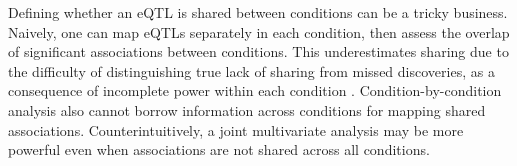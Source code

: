 Defining whether an \gls{eQTL} is shared between conditions can be a tricky business.
Naively, one can map \glspl{eQTL} separately in each condition, then assess the overlap of significant associations between conditions.
This underestimates sharing due to the difficulty of distinguishing true lack of sharing from missed discoveries,
as a consequence of incomplete power within each condition \autocite{flutre2013StatisticalFrameworkJoint,peters2016InsightGenotypePhenotypeAssociations}.
Condition-by-condition analysis also cannot borrow information across conditions for mapping shared associations\autocite{flutre2013StatisticalFrameworkJoint,urbut2018FlexibleStatisticalMethods,li2018HTeQTLIntegrativeExpression}.
Counterintuitively, a joint multivariate analysis may be more powerful even when associations are not shared across all conditions\autocite{stephens2013UnifiedFrameworkAssociation}.

